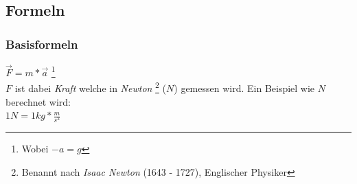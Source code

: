 \documentclass[10pt,a4paper,twoside]{article}
\begin{document}
	\subsection{Formeln}

	\subsubsection{Basisformeln}
	
	\begin{multicols}{2}
		\(\vec{F} = m * \vec{a}\) \footnote{Wobei \(-a = g\)} \\
		\(F\) ist dabei \textit{Kraft} welche in \textit{Newton} \footnote{Benannt nach \textit{Isaac Newton} (1643 - 1727), Englischer Physiker} (\(N\)) gemessen wird. Ein Beispiel wie \(N\) berechnet wird:\\
		\(1N = 1kg * \frac{m}{s^2}\)
		
	\end{multicols}
	
\end{document}
